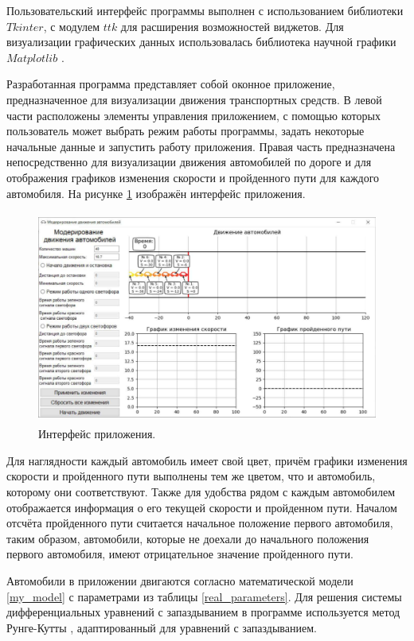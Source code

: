 \documentclass[12pt, a4paper]{extarticle}
\numberwithin{equation}{section}
\numberwithin{figure}{section}
\begin{document}
Пользовательский интерфейс программы выполнен с использованием библиотеки $Tkinter$, с модулем $ttk$ для расширения возможностей виджетов. Для визуализации графических данных использовалась библиотека научной графики $Matplotlib$ \cite{Matplotlib}.

Разработанная программа представляет собой оконное приложение, предназначенное для визуализации движения транспортных средств. В левой части расположены элементы управления приложением, с помощью которых пользователь может выбрать режим работы программы, задать некоторые начальные данные и запустить работу приложения. Правая часть предназначена непосредственно для визуализации движения автомобилей по дороге и для отображения графиков изменения скорости и пройденного пути для каждого автомобиля. На рисунке \ref{window} изображён интерфейс приложения. 

\begin{figure}[h!]  
	\begin{center}
		\includegraphics[keepaspectratio,width=160mm,height=70mm]
		{Images/screens/empty_window.pdf}
	\end{center}
	\caption{Интерфейс приложения.}
	\label{window}
\end{figure}

Для наглядности каждый автомобиль имеет свой цвет, причём графики изменения скорости и пройденного пути выполнены тем же цветом, что и автомобиль, которому они соответствуют. Также для удобства рядом с каждым автомобилем отображается информация о его текущей скорости и пройденном пути. Началом отсчёта пройденного пути считается начальное положение первого автомобиля, таким образом, автомобили, которые не доехали до начального положения первого автомобиля, имеют отрицательное значение пройденного пути.

Автомобили в приложении двигаются согласно математической модели \eqref{my_model} с параметрами из таблицы \ref{real_parameters}. Для решения системы дифференциальных уравнений с запаздыванием в программе используется метод Рунге-Кутты \cite{Runge_Kutta}, адаптированный для уравнений с запаздыванием.
\end{document}
